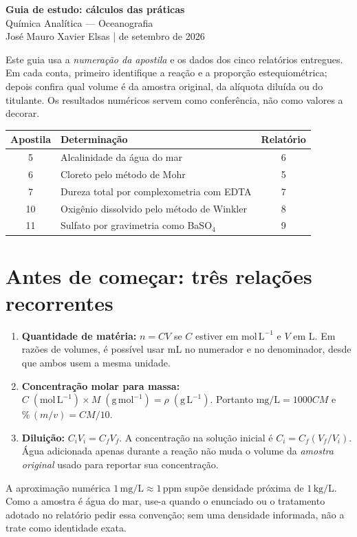 \documentclass[11pt,a4paper]{article}
\newcommand{\molL}{\mathrm{mol\,L^{-1}}}
\begin{document}
\begin{center}
{\Large\bfseries\color{azul} Guia de estudo: cálculos das práticas}\\[5pt]
{\large Química Analítica --- Oceanografia}\\[5pt]
\small José Mauro Xavier Elsas \quad |  de setembro de 2026
\end{center}

\noindent Este guia usa a \emph{numeração da apostila} e os dados dos cinco relatórios entregues. Em cada conta, primeiro identifique a reação e a proporção estequiométrica; depois confira qual volume é da amostra original, da alíquota diluída ou do titulante. Os resultados numéricos servem como conferência, não como valores a decorar.

\begin{center}
\begin{tabularx}{\linewidth}{@{}cXc@{}}\toprule
Apostila & Determinação & Relatório\\\midrule
5 & Alcalinidade da água do mar & 6\\
6 & Cloreto pelo método de Mohr & 5\\
7 & Dureza total por complexometria com EDTA & 7\\
10 & Oxigênio dissolvido pelo método de Winkler & 8\\
11 & Sulfato por gravimetria como BaSO$_4$ & 9\\\bottomrule
\end{tabularx}
\end{center}

\section*{Antes de começar: três relações recorrentes}
\begin{enumerate}
\item \textbf{Quantidade de matéria:} $n=CV$ se $C$ estiver em $\molL$ e $V$ em L. Em razões de volumes, é possível usar mL no numerador e no denominador, desde que ambos usem a mesma unidade.
\item \textbf{Concentração molar para massa:} $C\;(\molL)\times M\;(\mathrm{g\,mol^{-1}})=\rho\;(\mathrm{g\,L^{-1}})$. Portanto $\mathrm{mg/L}=1000CM$ e $\%\,(m/v)=CM/10$.
\item \textbf{Diluição:} $C_iV_i=C_fV_f$. A concentração na solução inicial é $C_i=C_f(V_f/V_i)$. Água adicionada apenas durante a reação não muda o volume da \emph{amostra original} usado para reportar sua concentração.
\end{enumerate}
\noindent A aproximação numérica $1\,\mathrm{mg/L}\approx1\,\mathrm{ppm}$ supõe densidade próxima de $1\,\mathrm{kg/L}$. Como a amostra é água do mar, use-a quando o enunciado ou o tratamento adotado no relatório pedir essa convenção; sem uma densidade informada, não a trate como identidade exata.
\end{document}
